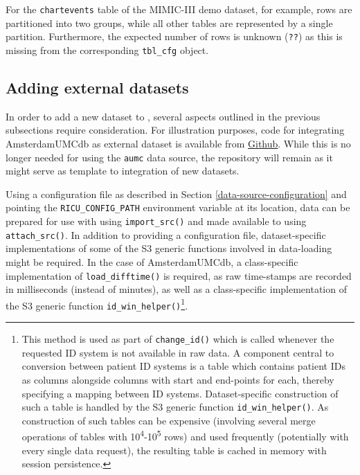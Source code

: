 \documentclass[
  notitle]{jss}
\begin{document}
For the \texttt{chartevents} table of the MIMIC-III demo dataset, for
example, rows are partitioned into two groups, while all other tables
are represented by a single partition. Furthermore, the expected number
of rows is unknown (\texttt{??}) as this is missing from the
corresponding \texttt{tbl\_cfg} object.

\hypertarget{adding-external-datasets}{%
\subsection{Adding external datasets}\label{adding-external-datasets}}

In order to add a new dataset to , several aspects outlined in
the previous subsections require consideration. For illustration
purposes, code for integrating AmsterdamUMCdb as external dataset is
available from \href{https://github.com/eth-mds/aumc}{Github}. While
this is no longer needed for using the \texttt{aumc} data source, the
repository will remain as it might serve as template to integration of
new datasets.

Using a configuration file as described in Section
\ref{data-source-configuration} and pointing the
\texttt{RICU\_CONFIG\_PATH} environment variable at its location, data
can be prepared for use with  using \texttt{import\_src()} and
made available to  using \texttt{attach\_src()}. In addition
to providing a configuration file, dataset-specific implementations of
some of the S3 generic functions involved in data-loading might be
required. In the case of AmsterdamUMCdb, a class-specific implementation
of \texttt{load\_difftime()} is required, as raw time-stamps are
recorded in milliseconds (instead of minutes), as well as a
class-specific implementation of the S3 generic function
\texttt{id\_win\_helper()}\footnote{This method is used as part of
  \texttt{change\_id()} which is called whenever the requested ID system
  is not available in raw data. A component central to conversion
  between patient ID systems is a table which contains patient IDs as
  columns alongside columns with start and end-points for each, thereby
  specifying a mapping between ID systems. Dataset-specific construction
  of such a table is handled by the S3 generic function
  \texttt{id\_win\_helper()}. As construction of such tables can be
  expensive (involving several merge operations of tables with
  10\textsuperscript{4}-10\textsuperscript{5} rows) and used frequently
  (potentially with every single data request), the resulting table is
  cached in memory with session persistence.}.
\end{document}
